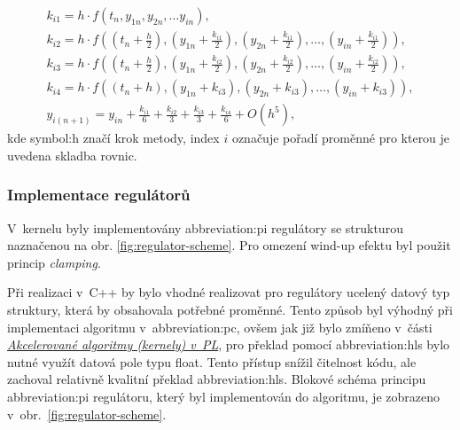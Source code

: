 \documentclass[a4paper, twoside, 11pt]{article}
\begin{document}
		\begin{equation}\label{eq:rk4-algoritmus-math-eq-in-kernel}
			\begin{gathered}
				k_{i 1} = h \cdot f(t_{n}, y_{1{n}}, y_{2{n}},\dots y_{{in}}),\\
				k_{i 2} = h \cdot f((t_{n}+\frac{h}{2}), (y_{1{n}} + \frac{k_{i 1}}{2}),(y_{2{n}}+ \frac{k_{i 1}}{2}),\dots , (y_{{in}}+\frac{k_{i 1}}{2})),\\
				k_{i 3} = h \cdot f((t_{n}+\frac{h}{2}), (y_{1{n}} + \frac{k_{i 2}}{2}), (y_{2{n}}+ \frac{k_{i 2}}{2}),\dots , (y_{{in}}+\frac{k_{i 2}}{2})),\\
				k_{i 4} = h \cdot f((t_{n}+h), (y_{1{n}} + k_{i 3}), (y_{2{n}}+ k_{i 3}),\dots , (y_{{in}}+k_{i 3})),\\
				y_{i(n+1)} = y_{i n} + \frac{k_{i 1}}{6} + \frac{k_{i 2}}{3} + \frac{k_{i 3}}{3} + \frac{k_{i 4}}{6} + O(h^{5}),
			\end{gathered}
		\end{equation}
		kde \gls{symbol:h} značí krok metody, index $i$ označuje pořadí proměnné pro kterou je uvedena skladba rovnic.\par

		\subsubsection{Implementace regulátorů}
			V~kernelu byly implementovány \gls{abbreviation:pi} regulátory se strukturou naznačenou na obr. \ref{fig:regulator-scheme}. Pro omezení wind-up efektu byl použit princip \textit{clamping}.\par
			Při realizaci v~C++ by bylo vhodné realizovat pro regulátory ucelený datový typ struktury, která by obsahovala potřebné proměnné. Tento způsob byl výhodný při implementaci algoritmu v~\gls{abbreviation:pc}, ovšem jak již bylo zmíňeno v~části \hyperref[subsec:akcelerovane-algoritmy-kernely-v-pl]{\textit{Akcelerované algoritmy (kernely) v~PL}}, pro překlad pomocí \gls{abbreviation:hls} bylo nutné využít datová pole typu float. Tento přístup snížil čitelnost kódu, ale zachoval relativně kvalitní překlad \gls{abbreviation:hls}. Blokové schéma principu \gls{abbreviation:pi} regulátoru, který byl implementován do algoritmu, je zobrazeno v~obr.~\ref{fig:regulator-scheme}.\par
			
\end{document}
